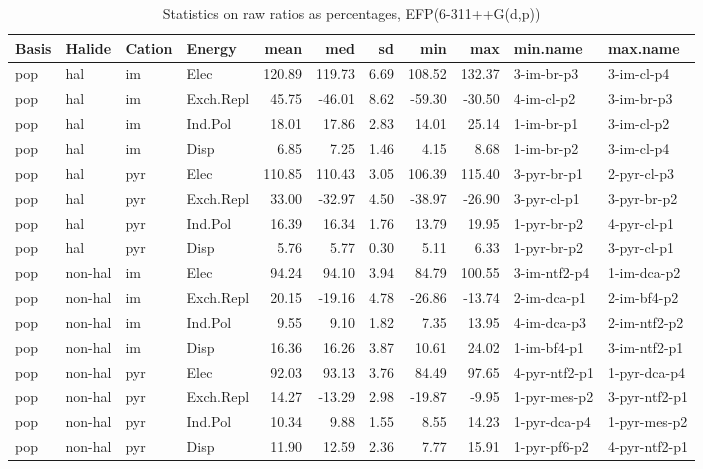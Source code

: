 \documentclass[a4paper]{article}
\begin{document}
\begin{table}[ht]
\centering
\begin{tabular}{llllrrrrrll}
  \hline
Basis & Halide & Cation & Energy & mean & med & sd & min & max & min.name & max.name \\ 
  \hline
pop & hal & im & Elec & 120.89 & 119.73 & 6.69 & 108.52 & 132.37 & 3-im-br-p3 & 3-im-cl-p4 \\ 
  pop & hal & im & Exch.Repl & 45.75 & -46.01 & 8.62 & -59.30 & -30.50 & 4-im-cl-p2 & 3-im-br-p3 \\ 
  pop & hal & im & Ind.Pol & 18.01 & 17.86 & 2.83 & 14.01 & 25.14 & 1-im-br-p1 & 3-im-cl-p2 \\ 
  pop & hal & im & Disp & 6.85 & 7.25 & 1.46 & 4.15 & 8.68 & 1-im-br-p2 & 3-im-cl-p4 \\ 
  pop & hal & pyr & Elec & 110.85 & 110.43 & 3.05 & 106.39 & 115.40 & 3-pyr-br-p1 & 2-pyr-cl-p3 \\ 
  pop & hal & pyr & Exch.Repl & 33.00 & -32.97 & 4.50 & -38.97 & -26.90 & 3-pyr-cl-p1 & 3-pyr-br-p2 \\ 
  pop & hal & pyr & Ind.Pol & 16.39 & 16.34 & 1.76 & 13.79 & 19.95 & 1-pyr-br-p2 & 4-pyr-cl-p1 \\ 
  pop & hal & pyr & Disp & 5.76 & 5.77 & 0.30 & 5.11 & 6.33 & 1-pyr-br-p2 & 3-pyr-cl-p1 \\ 
  pop & non-hal & im & Elec & 94.24 & 94.10 & 3.94 & 84.79 & 100.55 & 3-im-ntf2-p4 & 1-im-dca-p2 \\ 
  pop & non-hal & im & Exch.Repl & 20.15 & -19.16 & 4.78 & -26.86 & -13.74 & 2-im-dca-p1 & 2-im-bf4-p2 \\ 
  pop & non-hal & im & Ind.Pol & 9.55 & 9.10 & 1.82 & 7.35 & 13.95 & 4-im-dca-p3 & 2-im-ntf2-p2 \\ 
  pop & non-hal & im & Disp & 16.36 & 16.26 & 3.87 & 10.61 & 24.02 & 1-im-bf4-p1 & 3-im-ntf2-p1 \\ 
  pop & non-hal & pyr & Elec & 92.03 & 93.13 & 3.76 & 84.49 & 97.65 & 4-pyr-ntf2-p1 & 1-pyr-dca-p4 \\ 
  pop & non-hal & pyr & Exch.Repl & 14.27 & -13.29 & 2.98 & -19.87 & -9.95 & 1-pyr-mes-p2 & 3-pyr-ntf2-p1 \\ 
  pop & non-hal & pyr & Ind.Pol & 10.34 & 9.88 & 1.55 & 8.55 & 14.23 & 1-pyr-dca-p4 & 1-pyr-mes-p2 \\ 
  pop & non-hal & pyr & Disp & 11.90 & 12.59 & 2.36 & 7.77 & 15.91 & 1-pyr-pf6-p2 & 4-pyr-ntf2-p1 \\ 
   \hline
\end{tabular}
\caption{Statistics on raw ratios as percentages, EFP(6-311++G(d,p))}
\end{table}
\end{document}
